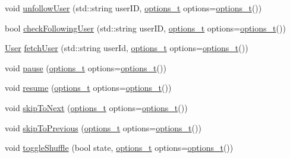 \begin{DoxyCompactItemize}
\item 
void \mbox{\hyperlink{class_spotify_a_p_i_a7f8c5253bf0fc8cbe8944edfc96ff030}{unfollow\+User}} (std\+::string user\+ID, \mbox{\hyperlink{_spotify_a_p_i_8h_a0ff5cac1a4007bb330b7d9939650c283}{options\+\_\+t}} options=\mbox{\hyperlink{_spotify_a_p_i_8h_a0ff5cac1a4007bb330b7d9939650c283}{options\+\_\+t}}())
\item 
bool \mbox{\hyperlink{class_spotify_a_p_i_a05fc84c40326e8fed074dd640bc518fc}{check\+Following\+User}} (std\+::string user\+ID, \mbox{\hyperlink{_spotify_a_p_i_8h_a0ff5cac1a4007bb330b7d9939650c283}{options\+\_\+t}} options=\mbox{\hyperlink{_spotify_a_p_i_8h_a0ff5cac1a4007bb330b7d9939650c283}{options\+\_\+t}}())
\item 
\mbox{\hyperlink{class_user}{User}} \mbox{\hyperlink{class_spotify_a_p_i_aac12cdeda01f0a32a4faedf659ba178d}{fetch\+User}} (std\+::string user\+Id, \mbox{\hyperlink{_spotify_a_p_i_8h_a0ff5cac1a4007bb330b7d9939650c283}{options\+\_\+t}} options=\mbox{\hyperlink{_spotify_a_p_i_8h_a0ff5cac1a4007bb330b7d9939650c283}{options\+\_\+t}}())
\item 
void \mbox{\hyperlink{class_spotify_a_p_i_a6464fecf1265757d979ca584ff85d877}{pause}} (\mbox{\hyperlink{_spotify_a_p_i_8h_a0ff5cac1a4007bb330b7d9939650c283}{options\+\_\+t}} options=\mbox{\hyperlink{_spotify_a_p_i_8h_a0ff5cac1a4007bb330b7d9939650c283}{options\+\_\+t}}())
\item 
void \mbox{\hyperlink{class_spotify_a_p_i_a76aefe27840ecd6bc61a9841af90dbc5}{resume}} (\mbox{\hyperlink{_spotify_a_p_i_8h_a0ff5cac1a4007bb330b7d9939650c283}{options\+\_\+t}} options=\mbox{\hyperlink{_spotify_a_p_i_8h_a0ff5cac1a4007bb330b7d9939650c283}{options\+\_\+t}}())
\item 
void \mbox{\hyperlink{class_spotify_a_p_i_ad6eafc052686ba413aa37188882d72c8}{skip\+To\+Next}} (\mbox{\hyperlink{_spotify_a_p_i_8h_a0ff5cac1a4007bb330b7d9939650c283}{options\+\_\+t}} options=\mbox{\hyperlink{_spotify_a_p_i_8h_a0ff5cac1a4007bb330b7d9939650c283}{options\+\_\+t}}())
\item 
void \mbox{\hyperlink{class_spotify_a_p_i_acefe16c25aeac587c9f7bf533088394f}{skip\+To\+Previous}} (\mbox{\hyperlink{_spotify_a_p_i_8h_a0ff5cac1a4007bb330b7d9939650c283}{options\+\_\+t}} options=\mbox{\hyperlink{_spotify_a_p_i_8h_a0ff5cac1a4007bb330b7d9939650c283}{options\+\_\+t}}())
\item 
void \mbox{\hyperlink{class_spotify_a_p_i_a7afa71cbe1d9b1b19df7ea98d2e5780c}{toggle\+Shuffle}} (bool state, \mbox{\hyperlink{_spotify_a_p_i_8h_a0ff5cac1a4007bb330b7d9939650c283}{options\+\_\+t}} options=\mbox{\hyperlink{_spotify_a_p_i_8h_a0ff5cac1a4007bb330b7d9939650c283}{options\+\_\+t}}())

\end{DoxyCompactItemize}
